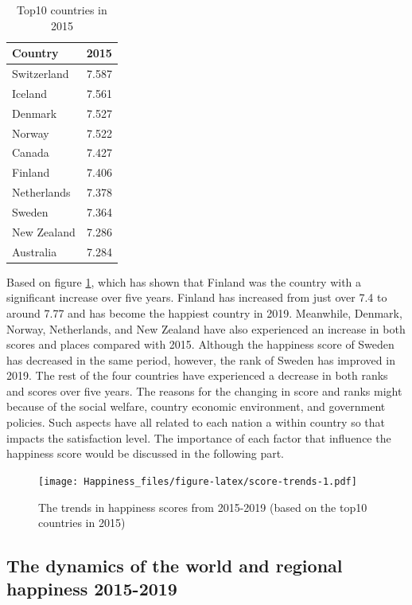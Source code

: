 \documentclass[11pt,a4paper,]{article}
\begin{document}
\begin{table}

\caption{\label{tab:top10-countries-2015}Top10 countries in 2015}
\centering
\begin{tabular}[t]{l|r}
\hline
Country & 2015\\
\hline
Switzerland & 7.587\\
\hline
Iceland & 7.561\\
\hline
Denmark & 7.527\\
\hline
Norway & 7.522\\
\hline
Canada & 7.427\\
\hline
Finland & 7.406\\
\hline
Netherlands & 7.378\\
\hline
Sweden & 7.364\\
\hline
New Zealand & 7.286\\
\hline
Australia & 7.284\\
\hline
\end{tabular}
\end{table}

Based on figure \ref{fig:score-trends}, which has shown that Finland was the country with a significant increase over five years. Finland has increased from just over 7.4 to around 7.77 and has become the happiest country in 2019. Meanwhile, Denmark, Norway, Netherlands, and New Zealand have also experienced an increase in both scores and places compared with 2015. Although the happiness score of Sweden has decreased in the same period, however, the rank of Sweden has improved in 2019. The rest of the four countries have experienced a decrease in both ranks and scores over five years. The reasons for the changing in score and ranks might because of the social welfare, country economic environment, and government policies. Such aspects have all related to each nation a within country so that impacts the satisfaction level. The importance of each factor that influence the happiness score would be discussed in the following part.

\begin{figure}
\centering
\texttt{[image: Happiness\_files/figure-latex/score-trends-1.pdf]}
\caption{\label{fig:score-trends}The trends in happiness scores from 2015-2019 (based on the top10 countries in 2015)}
\end{figure}

\hypertarget{the-dynamics-of-the-world-and-regional-happiness-2015-2019}{%
\subsection{The dynamics of the world and regional happiness 2015-2019}\label{the-dynamics-of-the-world-and-regional-happiness-2015-2019}}
\end{document}
